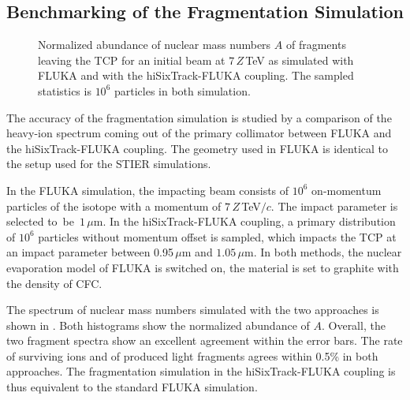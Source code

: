 \subsection{Benchmarking of the Fragmentation Simulation}

\begin{figure}[htbp]
  \centering
  \caption{Normalized abundance of nuclear mass numbers $A$ of fragments leaving the TCP for an initial \lead beam at $7\,Z\,$TeV as simulated with FLUKA and with the hiSixTrack-FLUKA coupling. The sampled statistics is $10^6$ particles in both simulation.}  
  \label{pic:16072401}
\end{figure}

The accuracy of the fragmentation simulation is studied by a comparison of the heavy-ion spectrum coming out of the primary collimator between FLUKA and the hiSixTrack-FLUKA coupling. The geometry used in FLUKA is identical to the setup used for the STIER simulations. 

In the FLUKA simulation, the impacting beam consists of $10^6$ on-momentum particles of the isotope \lead with a momentum of $7\,Z\,$TeV$/c$. The impact parameter is selected \mbox{to be $1\,\mu$m}. In the hiSixTrack-FLUKA coupling, a primary distribution of $10^6$ particles without momentum offset is sampled, which impacts the TCP at an impact parameter between 0.95$\,\mu$m and $1.05\,\mu$m. In both methods, the nuclear evaporation model of FLUKA is switched on, the material is set to graphite with the density of CFC.   

\newpage
The spectrum of nuclear mass numbers simulated with the two approaches is shown in . Both histograms show the normalized abundance of $A$. Overall, the two fragment spectra show an excellent agreement within the error bars. The rate of surviving \lead ions and of produced light fragments agrees within 0.5\% in both approaches. The fragmentation simulation in the hiSixTrack-FLUKA coupling is thus equivalent to the standard FLUKA simulation.



